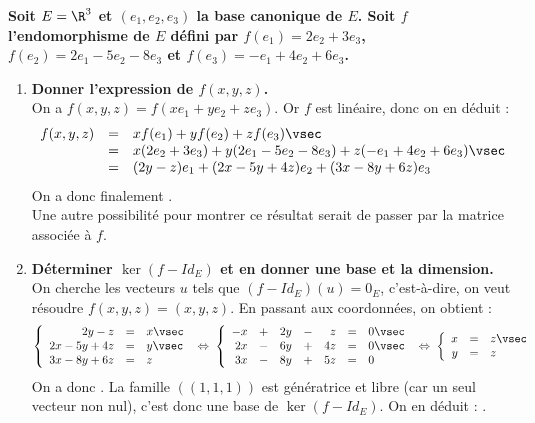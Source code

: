 \documentclass[a4paper, 11pt,reqno]{article}
\begin{document}
\begin{correction}   \;
	\textbf{Soit $E=\R^3$ et $(e_1,e_2,e_3)$ la base canonique de $E$. Soit $f$ l'endomorphisme de $E$ d\'efini par $f(e_1)=2e_2+3e_3$, $f(e_2)=2e_1-5e_2-8e_3$ et $f(e_3)=-e_1+4e_2+6e_3$.}
	\begin{enumerate}
		\item \textbf{Donner l'expression de $f(x,y,z)$.}\\
		      On a $f(x,y,z) = f(xe_1+ye_2+ze_3)$. Or $f$ est lin\'eaire, donc on en d\'eduit :
		      $$\begin{array}{rcl}
				      f(x,y,z) & = & x f(e_1) + y f(e_2) + z f(e_3)\vsec                         \\
				               & = & x(2e_2+3e_3) + y (2e_1-5e_2-8e_3) + z (-e_1+4e_2+6e_3)\vsec \\
				               & = & (2y-z) e_1 + (2x-5y+4z) e_2 + (3x-8y+6z)e_3
			      \end{array}$$
		      On a donc finalement .\\
		      Une autre possibilit\'e pour montrer ce r\'esultat serait de passer par la matrice associ\'ee \`a $f$.
		\item \textbf{D\'eterminer $\ker (f-Id_E)$ et en donner une base et la dimension.}\\
		      On cherche les vecteurs $u$ tels que $(f-Id_E)(u) = 0_E$, c'est-\`a-dire, on veut r\'esoudre $f(x,y,z) = (x,y,z)$. En passant aux coordonn\'ees, on obtient :
		      $$\left\{ \begin{array}{rcl}
				      2y-z     & = & x\vsec  \\
				      2x-5y+4z & = & y \vsec \\
				      3x-8y+6z & = & z
			      \end{array} \right.
			      \; \Leftrightarrow \;
			      \left\{ \begin{array}{rcrcrcl}
				      - x & + & 2y & - & z  & = & 0\vsec  \\
				      2x  & - & 6y & + & 4z & = & 0 \vsec \\
				      3x  & - & 8y & + & 5z & = & 0
			      \end{array} \right.
			      \; \Leftrightarrow \;
			      \left\{ \begin{array}{rcl}
				      x & = & z\vsec \\
				      y & = & z
			      \end{array} \right.$$
		      On a donc . La famille $((1,1,1))$ est g\'en\'eratrice et libre (car un seul vecteur non nul), c'est donc une base de $\ker(f-Id_E)$. On en d\'eduit : .

\end{enumerate}
\end{correction}
\end{document}
